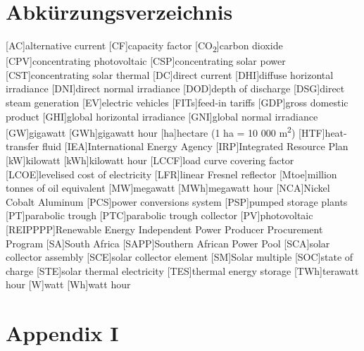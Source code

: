 \documentclass[Master,MEE,english]{twbook}%
\providecommand\listacroname{}
\renewcommand\listacroname{List of Abbreviations}
\renewcommand\listacroname{Abkürzungsverzeichnis}
\begin{document}
\chapter*{\listacroname}
\begin{acronym}[XXXXX]
  	[AC]{alternative current}
  	[CF]{capacity factor}
  	[CO\textsubscript{2}]{carbon dioxide}
    [CPV]{concentrating photovoltaic}
    [CSP]{concentrating solar power}
    [CST]{concentrating solar thermal} 
    [DC]{direct current}
    [DHI]{diffuse horizontal irradiance}
    [DNI]{direct normal irradiance}
	[DOD]{depth of discharge}
    [DSG]{direct steam generation}
    [EV]{electric vehicles}
    [FITs]{feed-in tariffs} 
    [GDP]{gross domestic product}
    [GHI]{global horizontal irradiance}
    [GNI]{global normal irradiance}
    [GW]{gigawatt}
    [GWh]{gigawatt hour} 
    [ha]{hectare (1 ha = 10 000 m\textsuperscript{2})} 
    [HTF]{heat-transfer fluid} 
    [IEA]{International Energy Agency}
    [IRP]{Integrated Resource Plan}
    [kW]{kilowatt}
    [kWh]{kilowatt hour}
    [LCCF]{load curve covering factor}
    [LCOE]{levelised cost of electricity}
    [LFR]{linear Fresnel reflector}
    [Mtoe]{million tonnes of oil equivalent}
    [MW]{megawatt}
    [MWh]{megawatt hour}
    [NCA]{Nickel Cobalt Aluminum}
    [PCS]{power conversions system}
    [PSP]{pumped storage plants}
    [PT]{parabolic trough}
    [PTC]{parabolic trough collector}
    [PV]{photovoltaic}
    [REIPPPP]{Renewable Energy Independent Power Producer Procurement Program}
    [SA]{South Africa}
    [SAPP]{Southern African Power Pool}
    [SCA]{solar collector assembly}
    [SCE]{solar collector element}
    [SM]{Solar multiple}
    [SOC]{state of charge}
    [STE]{solar thermal electricity}
    [TES]{thermal energy storage}
    [TWh]{terawatt hour}
    [W]{watt}
    [Wh]{watt hour}
\end{acronym}
%
%
\clearpage
\appendix
\chapter{Appendix I}
\end{document}
